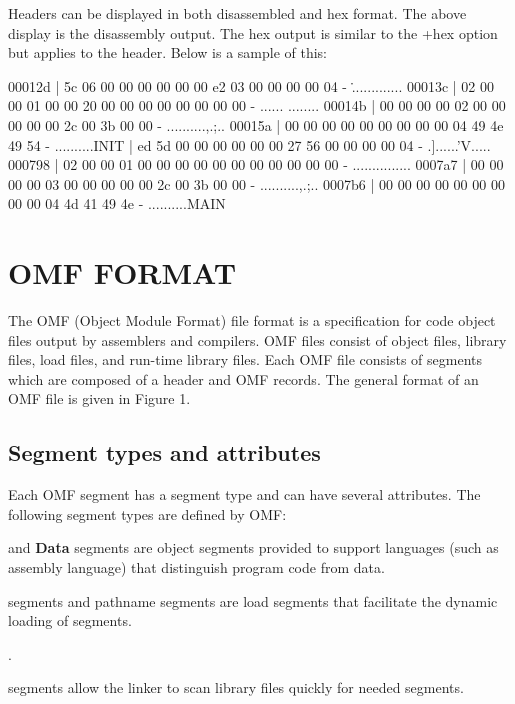 \description
Headers can be displayed in both disassembled and hex format. The above
display is the disassembly output. The hex output is similar to the +hex
option but applies to the header. Below is a sample of this:

\bigskip
\beginsample
00012d | 5c 06 00 00 00 00 00 00 e2 03 00 00 00 00 04 - \..............
00013c | 02 00 00 01 00 00 20 00 00 00 00 00 00 00 00 - ...... ........
00014b | 00 00 00 00 02 00 00 00 00 00 2c 00 3b 00 00 - ..........,.;..
00015a | 00 00 00 00 00 00 00 00 00 04 49 4e 49 54    - ..........INIT
 | ed 5d 00 00 00 00 00 00 27 56 00 00 00 00 04 - .]......'V.....
000798 | 02 00 00 01 00 00 00 00 00 00 00 00 00 00 00 - ...............
0007a7 | 00 00 00 00 03 00 00 00 00 00 2c 00 3b 00 00 - ..........,.;..
0007b6 | 00 00 00 00 00 00 00 00 00 04 4d 41 49 4e    - ..........MAIN
\endsample
\medskip

\vfill\eject


%

\section{OMF FORMAT}

\description
The OMF (Object Module Format) file format is a specification for code
object files output by assemblers and compilers. OMF files consist of
object files, library files, load files, and run-time library files.
Each OMF file consists of segments which are composed of a header and OMF
records. The general format of an OMF file is given in Figure 1.
\medskip

\subsection{Segment types and attributes}

\description
Each OMF segment has a segment type and can have several attributes. The
following segment types are defined by OMF:

 and {\bf Data} segments are object segments
provided to support languages (such as assembly language) that distinguish
program code from data.

 segments and pathname segments are load
segments that facilitate the dynamic loading of segments.

.

 segments allow the linker to scan
library files quickly for needed segments.

